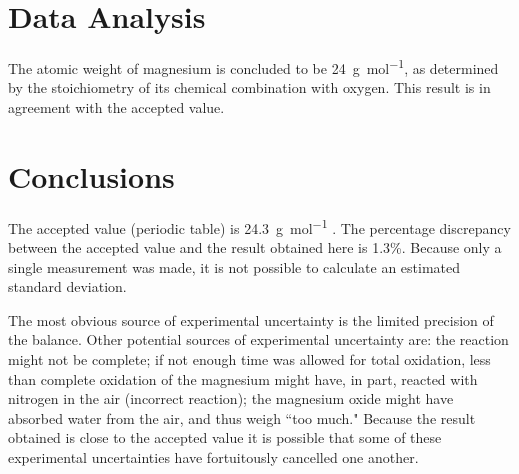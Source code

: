 \documentclass{article}
\begin{document}
\section{Data Analysis}

The atomic weight of magnesium is concluded to be \SI{24}{\gram\per\mol}, as determined by the stoichiometry of its chemical combination with oxygen. This result is in agreement with the accepted value.

%

 \section{Conclusions}

 The accepted value (periodic table) is \SI{24.3}{\gram\per\mole} \cite{Smith:2012qr}. The percentage discrepancy between the accepted value and the result obtained here is 1.3\%. Because only a single measurement was made, it is not possible to calculate an estimated standard deviation.

 The most obvious source of experimental uncertainty is the limited precision of the balance. Other potential sources of experimental uncertainty are: the reaction might not be complete; if not enough time was allowed for total oxidation, less than complete oxidation of the magnesium might have, in part, reacted with nitrogen in the air (incorrect reaction); the magnesium oxide might have absorbed water from the air, and thus weigh ``too much." Because the result obtained is close to the accepted value it is possible that some of these experimental uncertainties have fortuitously cancelled one another.





 

 



 
\end{document}

